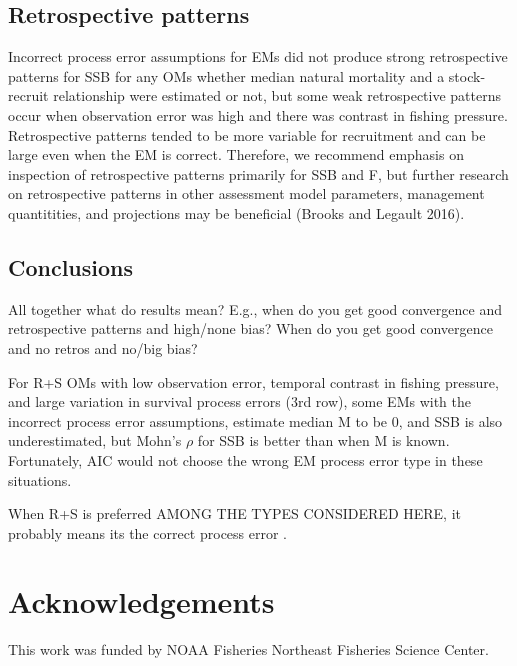\documentclass[
  12pt,
]{article}
\begin{document}
\hypertarget{retrospective-patterns}{%
\subsection*{Retrospective patterns}\label{retrospective-patterns}}

Incorrect process error assumptions for EMs did not produce strong
retrospective patterns for SSB for any OMs whether median natural
mortality and a stock-recruit relationship were estimated or not, but
some weak retrospective patterns occur when observation error was high
and there was contrast in fishing pressure. Retrospective patterns
tended to be more variable for recruitment and can be large even when
the EM is correct. Therefore, we recommend emphasis on inspection of
retrospective patterns primarily for SSB and F, but further research on
retrospective patterns in other assessment model parameters, management
quantitities, and projections may be beneficial (Brooks and Legault
2016).

\hypertarget{conclusions}{%
\subsection*{Conclusions}\label{conclusions}}

All together what do results mean? E.g., when do you get good
convergence and retrospective patterns and high/none bias? When do you
get good convergence and no retros and no/big bias?

For R+S OMs with low observation error, temporal contrast in fishing
pressure, and large variation in survival process errors (3rd row), some
EMs with the incorrect process error assumptions, estimate median M to
be 0, and SSB is also underestimated, but Mohn's \(\rho\) for SSB is
better than when M is known. Fortunately, AIC would not choose the wrong
EM process error type in these situations.

When R+S is preferred AMONG THE TYPES CONSIDERED HERE, it probably means
its the correct process error .

\hypertarget{acknowledgements}{%
\section*{Acknowledgements}\label{acknowledgements}}

This work was funded by NOAA Fisheries Northeast Fisheries Science
Center.
\end{document}

